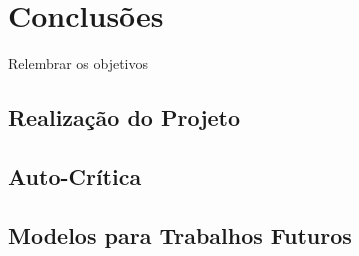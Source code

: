 \chapter{Conclusões}

 
	Relembrar os objetivos
	
	\section{Realização do Projeto}
	
	\section{Auto-Crítica}
	
	\section{Modelos para Trabalhos Futuros}
	